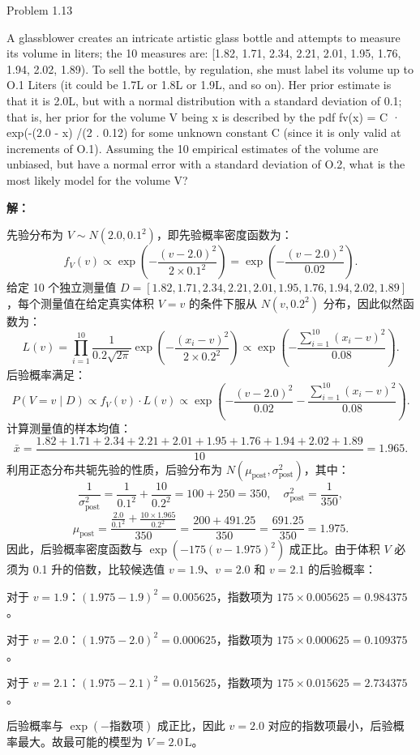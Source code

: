 \documentclass[12pt,a4paper]{article}
\newenvironment{exercise}[2][]
  {\begin{exercisebox}[#1]{#2}\ignorespaces}
  {\end{exercisebox}}
\newenvironment{problem}
  {\begin{problemnobox}\ignorespaces}
  {\end{problemnobox}}
\newenvironment{solution}
  {\par\noindent\textbf{\color{SolutionColor}解：}\ignorespaces}
  {}
\begin{document}
\begin{exercise}{Problem 1.13}
\begin{problem}
A glassblower creates an intricate artistic glass bottle and attempts to measure
its volume in liters; the 10 measures are:
[1.82, 1.71, 2.34, 2.21, 2.01, 1.95, 1.76, 1.94, 2.02, 1.89).
To sell the bottle, by regulation, she must label its volume up to O.1 Liters (it could
be 1.7L or 1.8L or 1.9L, and so on). Her prior estimate is that it is 2.0L, but with a
normal distribution with a standard deviation of 0.1; that is, her prior for the volume
V being x is described by the pdf
fv(x) = C · exp(-(2.0 - x) /(2 . 0.12)
for some unknown constant C (since it is only valid at increments of O.1). Assuming
the 10 empirical estimates of the volume are unbiased, but have a normal error with
a standard deviation of O.2, what is the most likely model for the volume V?
\end{problem}

\begin{solution}

先验分布为 $V \sim N(2.0, 0.1^2)$，即先验概率密度函数为：
\[
f_V(v) \propto \exp\left(-\frac{(v - 2.0)^2}{2 \times 0.1^2}\right) = \exp\left(-\frac{(v - 2.0)^2}{0.02}\right).
\]
给定 10 个独立测量值 $D = [1.82, 1.71, 2.34, 2.21, 2.01, 1.95, 1.76, 1.94, 2.02, 1.89]$，每个测量值在给定真实体积 $V = v$ 的条件下服从 $N(v, 0.2^2)$ 分布，因此似然函数为：
\[
L(v) = \prod_{i=1}^{10} \frac{1}{0.2\sqrt{2\pi}} \exp\left(-\frac{(x_i - v)^2}{2 \times 0.2^2}\right) \propto \exp\left(-\frac{\sum_{i=1}^{10} (x_i - v)^2}{0.08}\right).
\]
后验概率满足：
\[
P(V = v \mid D) \propto f_V(v) \cdot L(v) \propto \exp\left(-\frac{(v - 2.0)^2}{0.02} - \frac{\sum_{i=1}^{10} (x_i - v)^2}{0.08}\right).
\]
计算测量值的样本均值：
\[
\bar{x} = \frac{1.82 + 1.71 + 2.34 + 2.21 + 2.01 + 1.95 + 1.76 + 1.94 + 2.02 + 1.89}{10} = 1.965.
\]
利用正态分布共轭先验的性质，后验分布为 $N(\mu_{\text{post}}, \sigma_{\text{post}}^2)$，其中：
\[
\frac{1}{\sigma_{\text{post}}^2} = \frac{1}{0.1^2} + \frac{10}{0.2^2} = 100 + 250 = 350, \quad \sigma_{\text{post}}^2 = \frac{1}{350},
\]
\[
\mu_{\text{post}} = \frac{\frac{2.0}{0.1^2} + \frac{10 \times 1.965}{0.2^2}}{350} = \frac{200 + 491.25}{350} = \frac{691.25}{350} = 1.975.
\]
因此，后验概率密度函数与 $\exp\left(-175(v - 1.975)^2\right)$ 成正比。由于体积 $V$ 必须为 0.1 升的倍数，比较候选值 $v = 1.9$、$v = 2.0$ 和 $v = 2.1$ 的后验概率：

对于 $v = 1.9$：$(1.975 - 1.9)^2 = 0.005625$，指数项为 $175 \times 0.005625 = 0.984375$。

对于 $v = 2.0$：$(1.975 - 2.0)^2 = 0.000625$，指数项为 $175 \times 0.000625 = 0.109375$。

对于 $v = 2.1$：$(1.975 - 2.1)^2 = 0.015625$，指数项为 $175 \times 0.015625 = 2.734375$。

后验概率与 $\exp(-\text{指数项})$ 成正比，因此 $v = 2.0$ 对应的指数项最小，后验概率最大。故最可能的模型为 $V = 2.0\,\text{L}$。
\end{solution}
\end{exercise}
\end{document}
